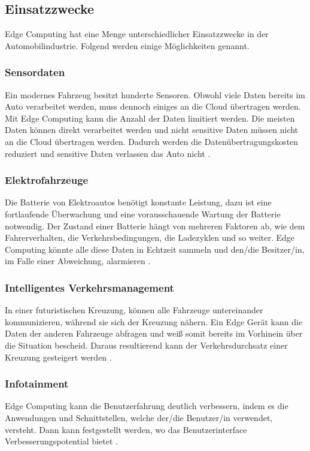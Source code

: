 \documentclass{sigchi}
\begin{document}
\subsection{Einsatzzwecke}
Edge Computing hat eine Menge unterschiedlicher Einsatzzwecke in der Automobilindustrie. Folgend werden einige Möglichkeiten genannt.

\subsubsection{Sensordaten}
Ein modernes Fahrzeug besitzt hunderte Sensoren. Obwohl viele Daten bereits im Auto verarbeitet werden, muss dennoch einiges an die Cloud übertragen werden. Mit Edge Computing kann die Anzahl der Daten limitiert werden. Die meisten Daten können direkt verarbeitet werden und nicht sensitive Daten müssen nicht an die Cloud übertragen werden. Dadurch werden die Datenübertragungskosten reduziert und sensitive Daten verlassen das Auto nicht \cite{role-edge-computing:2020}.

\subsubsection{Elektrofahrzeuge}
Die Batterie von Elektroautos benötigt konstante Leistung, dazu ist eine fortlaufende Überwachung und eine vorausschauende Wartung der Batterie notwendig. Der Zustand einer Batterie hängt von mehreren Faktoren ab, wie dem Fahrerverhalten, die Verkehrsbedingungen, die Ladezyklen und so weiter. Edge Computing könnte alle diese Daten in Echtzeit sammeln und den/die Besitzer/in, im Falle einer Abweichung, alarmieren \cite{role-edge-computing:2020}. 

\subsubsection{Intelligentes Verkehrsmanagement}
In einer futuristischen Kreuzung, können alle Fahrzeuge untereinander kommunizieren, während sie sich der Kreuzung nähern. Ein Edge Gerät kann die Daten der anderen Fahrzeuge abfragen und weiß somit bereits im Vorhinein über die Situation bescheid. Daraus resultierend kann der Verkehrsdurchsatz einer Kreuzung gesteigert werden \cite{role-edge-computing:2020}.

\subsubsection{Infotainment}
Edge Computing kann die Benutzerfahrung deutlich verbessern, indem es die Anwendungen und Schnittstellen, welche der/die Benutzer/in verwendet, versteht. Dann kann festgestellt werden, wo das Benutzerinterface Verbesserungspotential bietet \cite{role-edge-computing:2020}. 
\end{document}
